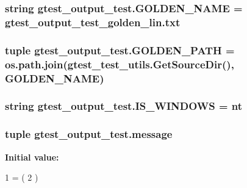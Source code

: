 \subsubsection[{G\+O\+L\+D\+E\+N\+\_\+\+N\+A\+M\+E}]{\setlength{\rightskip}{0pt plus 5cm}string gtest\+\_\+output\+\_\+test.\+G\+O\+L\+D\+E\+N\+\_\+\+N\+A\+M\+E = \textquotesingle{}gtest\+\_\+output\+\_\+test\+\_\+golden\+\_\+lin.\+txt\textquotesingle{}}\label{namespacegtest__output__test_a317ece7d11d9103a7bdbf0320b64a981}
\hypertarget{namespacegtest__output__test_ad37256f6954485deb074fd47ba08e84b}{}
\subsubsection[{G\+O\+L\+D\+E\+N\+\_\+\+P\+A\+T\+H}]{\setlength{\rightskip}{0pt plus 5cm}tuple gtest\+\_\+output\+\_\+test.\+G\+O\+L\+D\+E\+N\+\_\+\+P\+A\+T\+H = os.\+path.\+join({\bf gtest\+\_\+test\+\_\+utils.\+Get\+Source\+Dir}(), {\bf G\+O\+L\+D\+E\+N\+\_\+\+N\+A\+M\+E})}\label{namespacegtest__output__test_ad37256f6954485deb074fd47ba08e84b}
\hypertarget{namespacegtest__output__test_a76e823e0e56e3c25aa8b0aab4431f763}{}
\subsubsection[{I\+S\+\_\+\+W\+I\+N\+D\+O\+W\+S}]{\setlength{\rightskip}{0pt plus 5cm}string gtest\+\_\+output\+\_\+test.\+I\+S\+\_\+\+W\+I\+N\+D\+O\+W\+S = \textquotesingle{}nt\textquotesingle{}}\label{namespacegtest__output__test_a76e823e0e56e3c25aa8b0aab4431f763}
\hypertarget{namespacegtest__output__test_ac696d0798ad7d08cb2e61070824750e2}{}
\subsubsection[{message}]{\setlength{\rightskip}{0pt plus 5cm}tuple gtest\+\_\+output\+\_\+test.\+message}\label{namespacegtest__output__test_ac696d0798ad7d08cb2e61070824750e2}
{\bfseries Initial value\+:}
\begin{DoxyCode}
1 = (
2           )
\end{DoxyCode}
\hypertarget{namespacegtest__output__test_a7d428bb6e16eda248484d1428715858b}{}

